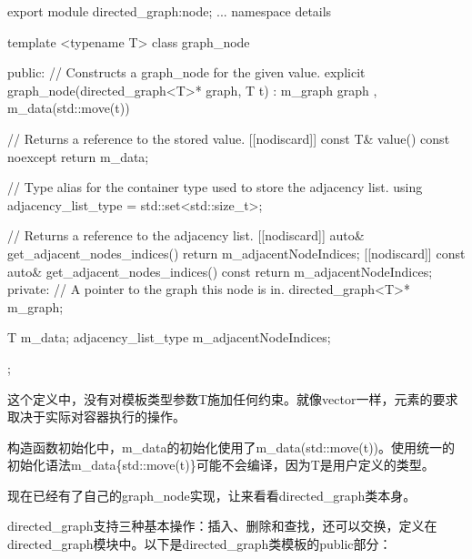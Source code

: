 \begin{cpp}
export module directed_graph:node;
...
namespace details
{
    template <typename T>
    class graph_node
    {
        public:
            // Constructs a graph_node for the given value.
            explicit graph_node(directed_graph<T>* graph, T t)
            : m_graph { graph }, m_data(std::move(t)) { }

            // Returns a reference to the stored value.
            [[nodiscard]] const T& value() const noexcept { return m_data; }

            // Type alias for the container type used to store the adjacency list.
            using adjacency_list_type = std::set<std::size_t>;

            // Returns a reference to the adjacency list.
            [[nodiscard]] auto& get_adjacent_nodes_indices() {
                return m_adjacentNodeIndices; }
            [[nodiscard]] const auto& get_adjacent_nodes_indices() const {
                return m_adjacentNodeIndices; }
        private:
            // A pointer to the graph this node is in.
            directed_graph<T>* m_graph;

            T m_data;
            adjacency_list_type m_adjacentNodeIndices;
    };
}
\end{cpp}

这个定义中，没有对模板类型参数T施加任何约束。就像vector一样，元素的要求取决于实际对容器执行的操作。

构造函数初始化中，m\_data的初始化使用了m\_data(std::move(t))。使用统一的初始化语法m\_data\{std::move(t)\}可能不会编译，因为T是用户定义的类型。

现在已经有了自己的graph\_node实现，让来看看directed\_graph类本身。


directed\_graph支持三种基本操作：插入、删除和查找，还可以交换，定义在directed\_graph模块中。以下是directed\_graph类模板的public部分：

